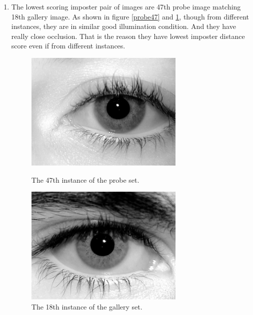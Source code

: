 \documentclass[a4paper]{article}
\begin{document}
\begin{spacing}{2.0}
\begin{enumerate}
	\item The lowest scoring imposter pair of images are 47th probe image matching 18th gallery image. As shown in figure \ref{probe47} and \ref{gallery18}, though from different instances, they are in similar good illumination condition. And they have really close occlusion. That is the reason they have lowest imposter distance score even if from different instances. 
	\begin{figure}[H]
	\begin{minipage}[t]{0.5\linewidth}
	\centering
	\includegraphics[width = 3in]{probe47.jpg}
	\caption{The 47th instance of the probe set.}
	\label{probe47}
	\end{minipage}
	\begin{minipage}[t]{0.5\linewidth}
	\centering
	\includegraphics[width = 3in]{gallery18.jpg}
	\caption{The 18th instance of the gallery set.}
	\label{gallery18}
	\end{minipage}
	\end{figure}
	

\end{enumerate}
\end{spacing}
\end{document}
